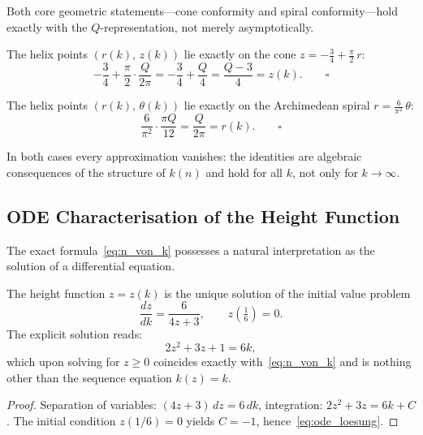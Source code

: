 Both core geometric statements---cone conformity and spiral conformity---hold
exactly with the $Q$-representation, not merely asymptotically.

\begin{satz}\label{satz:kegel}
The helix points $(r(k),\, z(k))$ lie exactly on the cone
$z = -\tfrac{3}{4} + \tfrac{\pi}{2}\,r$:
\[
  -\frac{3}{4} + \frac{\pi}{2}\cdot\frac{Q}{2\pi}
  = -\frac{3}{4} + \frac{Q}{4}
  = \frac{Q-3}{4}
  = z(k). \qquad \square
\]
\end{satz}

\begin{satz}\label{satz:spirale}
The helix points $(r(k),\, \theta(k))$ lie exactly on the
Archimedean spiral $r = \tfrac{6}{\pi^2}\,\theta$:
\[
  \frac{6}{\pi^2}\cdot\frac{\pi Q}{12}
  = \frac{Q}{2\pi}
  = r(k). \qquad \square
\]
\end{satz}

\noindent
In both cases every approximation vanishes: the identities are
algebraic consequences of the structure of $k(n)$ and hold for
all $k$, not only for $k \to \infty$.

\subsection{ODE Characterisation of the Height Function}
\label{subsec:ode}

The exact formula~\eqref{eq:n_von_k} possesses a natural
interpretation as the solution of a differential equation.

\begin{satz}\label{satz:ode}
The height function $z = z(k)$ is the unique solution of the
initial value problem
\begin{equation}\label{eq:ode_hoehe}
  \frac{dz}{dk} = \frac{6}{4z+3}, \qquad z\!\left(\tfrac{1}{6}\right) = 0.
\end{equation}
The explicit solution reads:
\begin{equation}\label{eq:ode_loesung}
  2z^2 + 3z + 1 = 6k,
\end{equation}
which upon solving for $z \geq 0$ coincides exactly
with~\eqref{eq:n_von_k} and is nothing other than the sequence
equation $k(z) = k$.
\end{satz}

\begin{proof}
Separation of variables: $(4z+3)\,dz = 6\,dk$,
integration: $2z^2 + 3z = 6k + C$.
The initial condition $z(1/6) = 0$ yields $C = -1$,
hence~\eqref{eq:ode_loesung}.
\end{proof}

